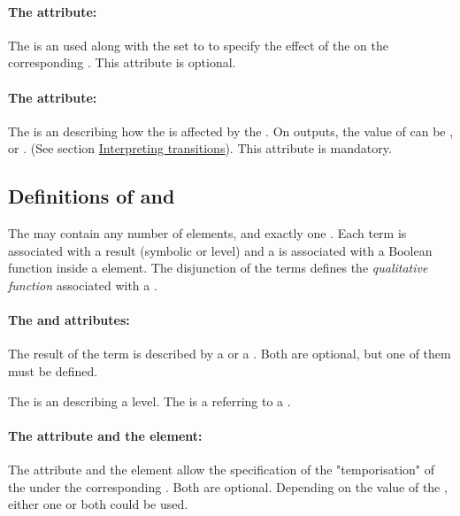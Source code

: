 \paragraph{The  attribute:}
The  is an  used along with the  set to  to specify the effect of the  on the corresponding . This attribute is optional.

\paragraph{The  attribute:}
The  is an  describing how the  is affected by the . On outputs, the value of  can be ,  or . (See section \hyperlink{inter_trans}{Interpreting transitions}). This attribute is mandatory.

\bigskip
\subsection*{Definitions of  and } %
The  may contain any number of  elements, and exactly one . Each term is associated with a result (symbolic or level) and a  is associated with a Boolean function inside a  element. The disjunction of the terms defines the \emph{qualitative function} associated with a .

\paragraph{The  and  attributes:}
The result of the term is described by a  or a . Both are optional, but one of them must be defined.

The  is an  describing a level. The  is a  referring to a .

\paragraph{The  attribute and the  element:}
The attribute  and the element  allow the specification of the "temporisation" of the  under the corresponding . Both are optional. Depending on the value of the , either one or both could be used.

